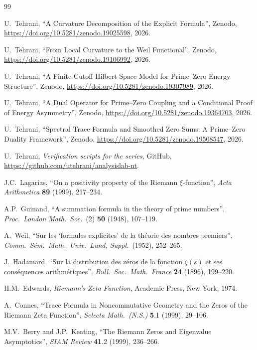 \documentclass[11pt]{article}
\begin{document}
\begin{thebibliography}{99}

U.~Tehrani,
``A Curvature Decomposition of the Explicit Formula'',
Zenodo, \url{https://doi.org/10.5281/zenodo.19025598}, 2026.

U.~Tehrani,
``From Local Curvature to the Weil Functional'',
Zenodo, \url{https://doi.org/10.5281/zenodo.19106992}, 2026.

U.~Tehrani,
``A Finite-Cutoff Hilbert-Space Model
for Prime--Zero Energy Structure'',
Zenodo, \url{https://doi.org/10.5281/zenodo.19307989}, 2026.

U.~Tehrani,
``A Dual Operator for Prime--Zero Coupling
and a Conditional Proof of Energy Asymmetry'',
Zenodo, \url{https://doi.org/10.5281/zenodo.19364703}, 2026.

U.~Tehrani,
``Spectral Trace Formula and Smoothed Zero Sums:
A Prime--Zero Duality Framework'',
Zenodo, \url{https://doi.org/10.5281/zenodo.19508547}, 2026.

U.~Tehrani,
\emph{Verification scripts for the series},
GitHub, \url{https://github.com/utehrani/analysislab-nt}.

J.C.~Lagarias,
``On a positivity property of the Riemann $\xi$-function'',
\emph{Acta Arithmetica} \textbf{89} (1999), 217--234.

A.P.~Guinand,
``A summation formula in the theory of prime numbers'',
\emph{Proc.\ London Math.\ Soc.}\ (2) \textbf{50} (1948), 107--119.

A.~Weil,
``Sur les `formules explicites' de la th\'eorie des nombres
premiers'',
\emph{Comm.\ S\'em.\ Math.\ Univ.\ Lund, Suppl.}\ (1952), 252--265.

J.~Hadamard,
``Sur la distribution des z\'eros de la fonction $\zeta(s)$
et ses cons\'equences arithm\'etiques'',
\emph{Bull.\ Soc.\ Math.\ France} \textbf{24} (1896), 199--220.

H.M.~Edwards,
\emph{Riemann's Zeta Function},
Academic Press, New York, 1974.

A.~Connes,
``Trace Formula in Noncommutative Geometry and the Zeros of the
Riemann Zeta Function'',
\emph{Selecta Math.\ (N.S.)} \textbf{5}.1 (1999), 29--106.

M.V.~Berry and J.P.~Keating,
``The Riemann Zeros and Eigenvalue Asymptotics'',
\emph{SIAM Review} \textbf{41}.2 (1999), 236--266.


\end{thebibliography}
\end{document}

